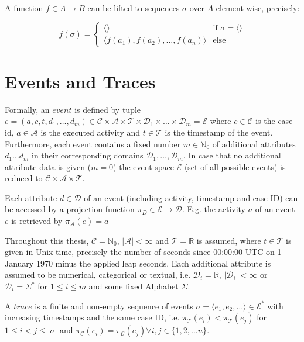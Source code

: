 A function $f \in A \rightarrow B$ can be lifted to sequences $\sigma$ over $A$ element-wise, precisely:

	\[
	f(\sigma) =
	\begin{cases}
	\langle \rangle & \text{if $\sigma = \langle \rangle$} \\
	\langle f(a_1), f(a_2), \dots, f(a_n)\rangle & \text{else} 
	\end{cases}
	\]


\section{Events and Traces}

\begin{definition}
Formally, an  $event$ is defined by tuple $e = (a,c,t,d_1,\dots, d_m) \in \mathcal{C} \times \mathcal{A}  \times \mathcal{T} \times \mathcal{D}_1 \times \dots \times \mathcal{D}_m =  \mathcal{E}$ where  $c \in \mathcal{C} $ is the case id, $a \in \mathcal{A}$ is the executed activity and $t \in \mathcal{T}$ is the timestamp of the event.
Furthermore, each event contains a fixed number $m \in \mathbb{N}_0$ of additional attributes $d_1 \dots d_m$ in their corresponding domains $\mathcal{D}_1, \dots , \mathcal{D}_m$.
In case that no additional attribute data is given ($m = 0$) the event space $\mathcal{E}$ (set of all possible events) is reduced to $\mathcal{C} \times \mathcal{A}  \times \mathcal{T}$.
\end{definition}

Each attribute $d \in \mathcal{D}$ of an event (including activity, timestamp and case ID) can be accessed by a projection function $\pi_D \in \mathcal{E} \rightarrow \mathcal{D}$.
E.g. the activity $a$ of an event $e$ is retrieved by $\pi_\mathcal{A}(e) = a$

Throughout this thesis,  $\mathcal{C} = \mathbb{N}_0$, $|\mathcal{A}| < \infty$ and $ \mathcal{T} = \mathbb{R}$ is assumed, where $t \in \mathcal{T}$ is given in Unix time, precisely the number of seconds since 00:00:00 UTC on 1 January 1970 minus the applied leap seconds.
Each additional attribute is assumed to be numerical, categorical or textual, i.e. $\mathcal{D}_i = \mathbb{R}$, $|\mathcal{D}_i| < \infty$ or $\mathcal{D}_i = \Sigma^\ast$  for $1 \leq i \leq m$ and some fixed Alphabet $\Sigma$.

\begin{definition}
	A $trace$ is a finite and non-empty sequence of events $\sigma = \langle e_1, e_2, \dots\rangle \in  \mathcal{E}^\ast$ with increasing timestamps and the same case ID, i.e. $\pi_\mathcal{T} (e_i) < \pi_\mathcal{T} (e_j) $ for $1 \leq i < j \leq |\sigma|$ and $\pi_\mathcal{C} (e_i) = \pi_\mathcal{C} (e_j) \forall i,j \in \{1, 2, \dots n\}$.
\end{definition}

